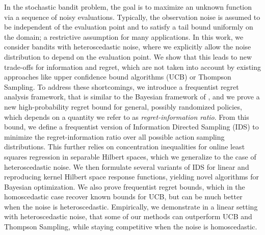 In the stochastic bandit problem, the goal is to maximize an unknown function via a sequence of noisy evaluations. Typically, the observation noise is assumed to be independent of the evaluation point and to satisfy a tail bound uniformly on the domain; a restrictive assumption for many applications. In this work, we consider bandits with heteroscedastic noise, where we explicitly allow the noise distribution to depend on the evaluation point. We show that this leads to new trade-offs for information and regret, which are not taken into account by existing approaches like upper confidence bound algorithms (UCB) or Thompson Sampling. To address these shortcomings, we introduce a frequentist regret analysis framework, that is similar to the Bayesian framework of \cite{RussoLearningOptimizeInformationDirected2014}, and we prove a new high-probability regret bound for general, possibly randomized policies, which depends on a quantity we refer to as \emph{regret-information ratio}. From this bound, we define a frequentist version of Information Directed Sampling (IDS) to minimize the regret-information ratio over all possible action sampling distributions. This further relies on concentration inequalities for online least squares regression in separable Hilbert spaces, which we generalize to the case of heteroscedastic noise. We then formulate several variants of IDS for linear and reproducing kernel Hilbert space response functions, yielding novel algorithms for Bayesian optimization. We also prove frequentist regret bounds, which in the homoscedastic case recover known bounds for UCB, but can be much better when the noise is heteroscedastic. Empirically, we demonstrate in a linear setting with heteroscedastic noise, that some of our methods can outperform UCB and Thompson Sampling, while staying competitive when the noise is homoscedastic. 